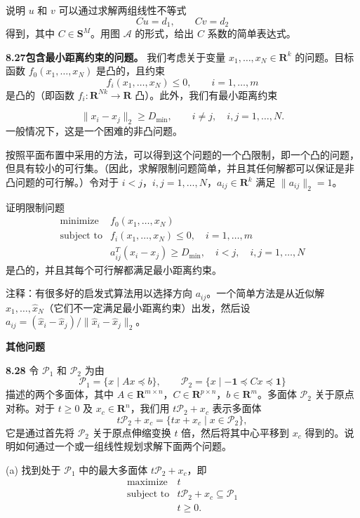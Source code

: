 \documentclass[UTF8,12pt,a4paper,fontset=fandol]{ctexart}
\begin{document}
说明 $u$ 和 $v$ 可以通过求解两组线性不等式
\[
Cu=d_1,\qquad Cv=d_2
\]
得到，其中 $C\in\mathbf{S}^M$。用图 $\mathcal A$ 的形式，给出 $C$ 系数的简单表达式。

\noindent\textbf{8.27\quad 包含最小距离约束的问题。}
我们考虑关于变量 $x_1,\ldots,x_N\in\mathbf{R}^k$ 的问题。目标函数 $f_0(x_1,\ldots,x_N)$ 是凸的，且约束
\[
f_i(x_1,\ldots,x_N)\leq 0,\qquad i=1,\ldots,m
\]
是凸的（即函数 $f_i:\mathbf{R}^{Nk}\to\mathbf{R}$ 凸）。此外，我们有最小距离约束

\[
\|x_i-x_j\|_2\geq D_{\min},\qquad i\neq j,\quad i,j=1,\ldots,N.
\]
一般情况下，这是一个困难的非凸问题。

按照平面布置中采用的方法，可以得到这个问题的一个凸限制，即一个凸的问题，但具有较小的可行集。（因此，求解限制问题简单，并且其任何解都可以保证是非凸问题的可行解。）令对于 $i<j$，$i,j=1,\ldots,N$，$a_{ij}\in\mathbf{R}^k$ 满足 $\|a_{ij}\|_2=1$。

证明限制问题
\[
\begin{array}{ll}
\mbox{minimize} & f_0(x_1,\ldots,x_N)\\
\mbox{subject to} & f_i(x_1,\ldots,x_N)\leq 0,\quad i=1,\ldots,m\\
& a_{ij}^T(x_i-x_j)\geq D_{\min},\quad i<j,\quad i,j=1,\ldots,N
\end{array}
\]
是凸的，并且其每个可行解都满足最小距离约束。

注释：有很多好的启发式算法用以选择方向 $a_{ij}$。一个简单方法是从近似解 $\hat x_1,\ldots,\hat x_N$（它们不一定满足最小距离约束）出发，然后设 $a_{ij}=(\hat x_i-\hat x_j)/\|\hat x_i-\hat x_j\|_2$。

\noindent\textbf{其他问题}

\noindent\textbf{8.28}
令 $\mathcal P_1$ 和 $\mathcal P_2$ 为由
\[
\mathcal P_1=\{x\mid Ax\preceq b\},\qquad
\mathcal P_2=\{x\mid -\mathbf{1}\preceq Cx\preceq \mathbf{1}\}
\]
描述的两个多面体，其中 $A\in\mathbf{R}^{m\times n}$，$C\in\mathbf{R}^{p\times n}$，$b\in\mathbf{R}^m$。多面体 $\mathcal P_2$ 关于原点对称。对于 $t\geq 0$ 及 $x_c\in\mathbf{R}^n$，我们用 $t\mathcal P_2+x_c$ 表示多面体
\[
t\mathcal P_2+x_c=\{tx+x_c\mid x\in\mathcal P_2\},
\]
它是通过首先将 $\mathcal P_2$ 关于原点伸缩变换 $t$ 倍，然后将其中心平移到 $x_c$ 得到的。说明如何通过一个或一组线性规划求解下面两个问题。

(a) 找到处于 $\mathcal P_1$ 中的最大多面体 $t\mathcal P_2+x_c$，即
\[
\begin{array}{ll}
\mbox{maximize} & t\\
\mbox{subject to} & t\mathcal P_2+x_c\subseteq\mathcal P_1\\
& t\geq 0.
\end{array}
\]
\end{document}
